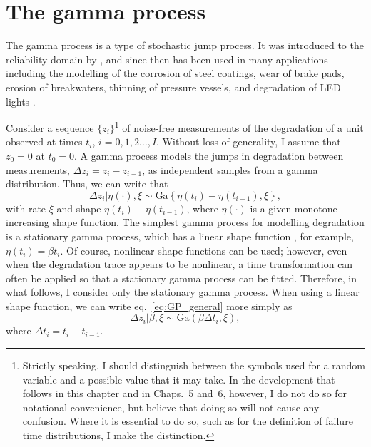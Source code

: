\section{The gamma process} \label{sec:GP}

The gamma process is a type of stochastic jump process. It was introduced to the reliability domain by \citet{abdel-hameed1975}, and since then has been used in many applications including the modelling of the corrosion of steel coatings, wear of brake pads, erosion of breakwaters, thinning of pressure vessels, and degradation of LED lights \citep{van_noortwijk2009}.

Consider a sequence $\{z_i\}$\footnote{Strictly speaking, I should distinguish between the symbols used for a random variable and a possible value that it may take. In the development that follows in this chapter and in Chaps.~5 and~6, however, I do not do so for notational convenience, but believe that doing so will not cause any confusion. Where it is essential to do so, such as for the definition of failure time distributions, I make the distinction.} of noise-free measurements of the degradation of a unit observed at times $t_i$, $i = 0, 1, 2 \ldots, I$. Without loss of generality, I assume that $z_0 = 0$ at $t_0 = 0$. A gamma process \citep{lawless2004} models the jumps in degradation between measurements, $\Delta z_i = z_i - z_{i-1}$, as independent samples from a gamma distribution. Thus, we can write that
\begin{equation} \label{eq:GP_general}
  \Delta z_i|\eta(\cdot), \xi \sim \mbox{Ga} \left\{ \eta(t_i) - \eta(t_{i-1}), \xi \right\},
\end{equation}
with rate $\xi$ and shape $\eta(t_i) - \eta(t_{i-1})$, where $\eta(\cdot)$ is a given monotone increasing shape function. The simplest gamma process for modelling degradation is a stationary gamma process, which has a linear shape function \citep{frenk2007}, for example, $\eta(t_i) = \beta t_i$. Of course, nonlinear shape functions can be used; however, even when the degradation trace appears to be nonlinear, a time transformation can often be applied so that a stationary gamma process can be fitted. Therefore, in what follows, I consider only the stationary gamma process. When using a linear shape function, we can write eq.~\eqref{eq:GP_general} more simply as
\begin{equation} \label{eq:GP_stationary}
  \Delta z_i| \beta, \xi \sim \mbox{Ga} \left( \beta \Delta t_i, \xi \right),
\end{equation}
where $\Delta t_i = t_i - t_{i-1}$.

